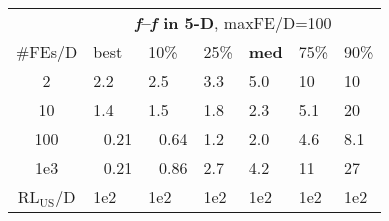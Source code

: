 \begin{tabular}{c|llllll}
 & \multicolumn{6}{|c}{\textbf{\textit{f}\raisebox{-0.35ex}{1}--\textit{f}\raisebox{-0.35ex}{24} in 5-D}, maxFE/D=100}\\
\#FEs/D & best & 10\% & 25\% & \textbf{med} & 75\% & 90\%\\
2 & \hspace*{1ex}2.2 & \hspace*{1ex}2.5 & \hspace*{1ex}3.3 & \hspace*{1ex}5.0 & 10 & 10\\
10 & \hspace*{1ex}1.4 & \hspace*{1ex}1.5 & \hspace*{1ex}1.8 & \hspace*{1ex}2.3 & \hspace*{1ex}5.1 & 20\\
100 & ~\,0.21 & ~\,0.64 & \hspace*{1ex}1.2 & \hspace*{1ex}2.0 & \hspace*{1ex}4.6 & \hspace*{1ex}8.1\\
1e3 & ~\,0.21 & ~\,0.86 & \hspace*{1ex}2.7 & \hspace*{1ex}4.2 & 11 & 27\\
$\text{RL}_{\text{US}}$/D & 1e2 & 1e2 & 1e2 & 1e2 & 1e2 & 1e2
\end{tabular}
